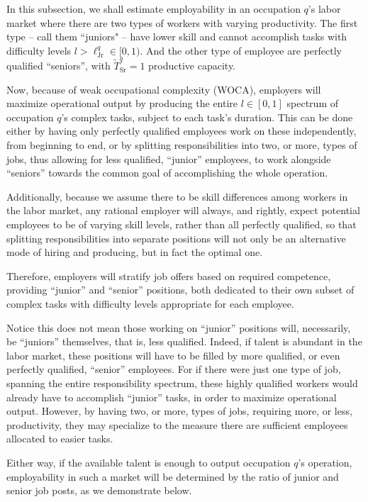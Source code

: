 \documentclass[hidelinks, nonatbib]{elsarticle}
\begin{document}
In this subsection, we shall estimate employability in an occupation $q$'s labor market where there are two types of workers with varying productivity. The first type -- call them ``juniors" -- have lower skill and cannot accomplish tasks with difficulty levels $l > \ell_{\text{Jr}}^{q} \in [0,1)$. And the other type of employee are perfectly qualified ``seniors'', with $\tilde{T}_{\text{Sr}}^{q} = 1$ productive capacity.

Now, because of weak occupational complexity (WOCA), employers will maximize operational output by producing the entire $l \in [0,1]$ spectrum of occupation $q$'s complex tasks, subject to each task's duration. This can be done either by having only perfectly qualified employees work on these independently, from beginning to end, or by splitting responsibilities into two, or more, types of jobs, thus allowing for less qualified, ``junior'' employees, to work alongside ``seniors'' towards the common goal of accomplishing the whole operation.

Additionally, because we assume there to be skill differences among workers in the labor market, any rational employer will always, and rightly, expect potential employees to be of varying skill levels, rather than all perfectly qualified, so that splitting responsibilities into separate positions will not only be an alternative mode of hiring and producing, but in fact the optimal one.

Therefore, employers will stratify job offers based on required competence, providing ``junior'' and ``senior'' positions, both dedicated to their own subset of complex tasks with difficulty levels appropriate for each employee.

Notice this does not mean those working on ``junior'' positions will, necessarily, be ``juniors'' themselves, that is, less qualified. Indeed, if talent is abundant in the labor market, these positions will have to be filled by more qualified, or even perfectly qualified, ``senior'' employees. For if there were just one type of job, spanning the entire responsibility spectrum, these highly qualified workers would already have to accomplish ``junior'' tasks, in order to maximize operational output. However, by having two, or more, types of jobs, requiring more, or less, productivity, they may specialize to the measure there are sufficient employees allocated to easier tasks.

Either way, if the available talent is enough to output occupation $q$'s operation, employability in such a market will be determined by the ratio of junior and senior job posts, as we demonstrate below.
\end{document}
